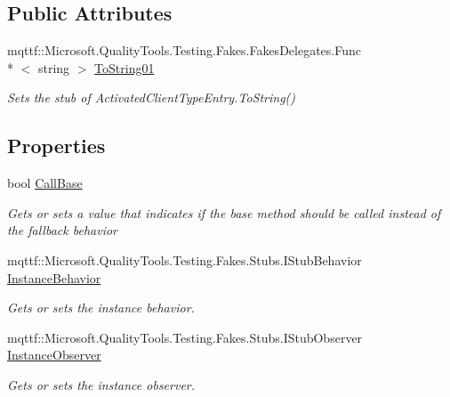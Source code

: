 \subsection*{Public Attributes}
\begin{DoxyCompactItemize}
\item 
mqttf\-::\-Microsoft.\-Quality\-Tools.\-Testing.\-Fakes.\-Fakes\-Delegates.\-Func\\*
$<$ string $>$ \hyperlink{class_system_1_1_runtime_1_1_remoting_1_1_fakes_1_1_stub_activated_client_type_entry_a55c95c427f573acaa86f830662112678}{To\-String01}
\begin{DoxyCompactList}\small\item\em Sets the stub of Activated\-Client\-Type\-Entry.\-To\-String()\end{DoxyCompactList}\end{DoxyCompactItemize}
\subsection*{Properties}
\begin{DoxyCompactItemize}
\item 
bool \hyperlink{class_system_1_1_runtime_1_1_remoting_1_1_fakes_1_1_stub_activated_client_type_entry_acaade506dc50f26dcd2d189aac065542}{Call\-Base}
\begin{DoxyCompactList}\small\item\em Gets or sets a value that indicates if the base method should be called instead of the fallback behavior\end{DoxyCompactList}\item 
mqttf\-::\-Microsoft.\-Quality\-Tools.\-Testing.\-Fakes.\-Stubs.\-I\-Stub\-Behavior \hyperlink{class_system_1_1_runtime_1_1_remoting_1_1_fakes_1_1_stub_activated_client_type_entry_a56345e4386d89977ba4fb221708dc903}{Instance\-Behavior}
\begin{DoxyCompactList}\small\item\em Gets or sets the instance behavior.\end{DoxyCompactList}\item 
mqttf\-::\-Microsoft.\-Quality\-Tools.\-Testing.\-Fakes.\-Stubs.\-I\-Stub\-Observer \hyperlink{class_system_1_1_runtime_1_1_remoting_1_1_fakes_1_1_stub_activated_client_type_entry_a4bcb0b546c52276fc0c155accbfa4d84}{Instance\-Observer}
\begin{DoxyCompactList}\small\item\em Gets or sets the instance observer.\end{DoxyCompactList}\end{DoxyCompactItemize}


